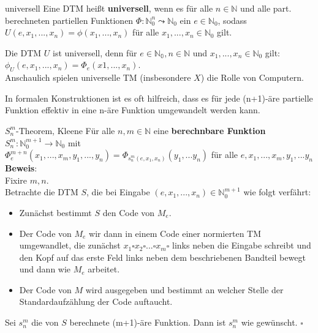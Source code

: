 \begin{defn}{universell}
    Eine DTM heißt \textbf{universell}, wenn es für alle $n \in \mathbb{N}$ und alle part. berechneten 
    partiellen Funktionen $\Phi : \mathbb{N}_0^n \leadsto \mathbb{N}_0$ ein $e \in \mathbb{N}_0$, sodass
    $U(e,x_1,...,x_n) = \phi(x_1,...,x_n)$ für alle $x_1,...,x_n \in \mathbb{N}_0$ gilt. 
\end{defn}

\begin{bem}
    Die DTM $U$ ist universell, denn für $e \in \mathbb{N_0}, n \in \mathbb{N}$ und $x_1,...,x_n \in \mathbb{N}_0$ gilt: \\
    $\phi_U(e,x_1,...,x_n) = \Phi_e(x1,...,x_n)$. \\

    Anschaulich spielen universelle TM (insbesondere $X$) die Rolle von Computern.
\end{bem}

In formalen Konstruktionen ist es oft hilfreich, dass es für jede (n+1)-äre partielle Funktion effektiv in eine n-äre
Funktion umgewandelt werden kann.

\begin{satz}{$S^m_n$-Theorem, Kleene}
    Für alle $n,m \in \mathbb{N}$ eine \textbf{berechnbare Funktion} $S^m_n : \mathbb{N}_0^{m+1} \rightarrow \mathbb{N}_0$ mit \\
    $\Phi^{m+n}_e(x_1,...,x_m,y_1,...,y_n) = \Phi_{s^m_n(e,x_1,x_n)}(y_1,...y_n)$ für alle $e,x_1,...,x_m,y_1,...y_n$ \\

    \textbf{Beweis}:\\
    Fixire $m,n$. \\
    Betrachte die DTM $S$, die bei Eingabe $(e,x_1,...,x_n) \in \mathbb{N}^{m+1}_0$ wie folgt verfährt:
    \begin{itemize}
        \item Zunächst bestimmt $S$ den Code von $M_e$.
        \item Der Code von $M_e$ wir dann in einem Code einer normierten TM umgewandlet,
              die zunächst $x_1 \square x_2 \square ... \square x_m \square$ links neben
              die Eingabe schreibt und den Kopf auf das erste Feld links neben dem beschriebenen
              Bandteil bewegt und dann wie $M_e$ arbeitet.
        \item Der Code von $M$ wird ausgegeben und bestimmt an welcher Stelle der Standardaufzählung
              der Code auftaucht.
    \end{itemize}
    Sei $s^m_n$ die von $S$ berechnete (m+1)-äre Funktion. Dann ist $s^m_n$ wie gewünscht. $\square$
\end{satz}
